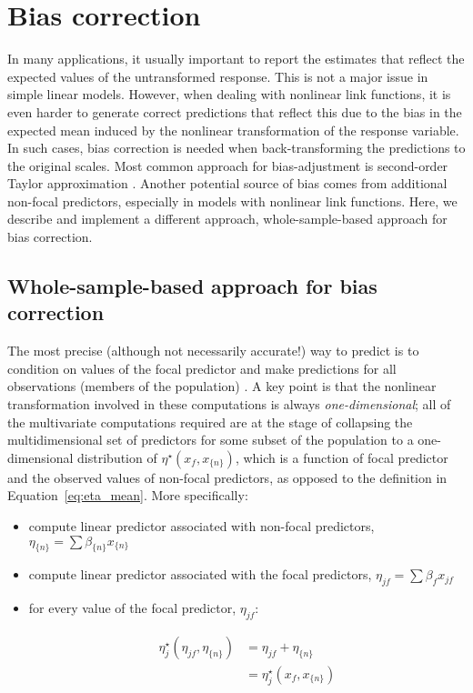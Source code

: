 \documentclass[10pt,letterpaper]{article}
\newcommand{\nset}[1]{#1_{\{n\}}}
\begin{document}
\section*{Bias correction}

In many applications, it usually important to report the estimates that reflect the expected values of the untransformed response. This is not a major issue in simple linear models. However, when dealing with nonlinear link functions, it is even harder to generate correct predictions that reflect this due to the bias in the expected mean induced by the nonlinear transformation of the response variable. In such cases, bias correction is needed when back-transforming the predictions to the original scales. Most common approach for bias-adjustment is second-order Taylor approximation \cite{lenth2018package, duursma2003bias}. Another potential source of bias comes from additional non-focal predictors, especially in models with nonlinear link functions. Here, we describe and implement a different approach, whole-sample-based approach for bias correction.


\subsection*{Whole-sample-based approach for bias correction}

The most precise (although not necessarily accurate!) way to predict is to condition on values of the focal predictor and make predictions for all observations (members of the population) \cite{hanmer2013behind}. A key point is that the nonlinear transformation involved in these computations is always \emph{one-dimensional}; all of the multivariate computations required are at the stage of collapsing the multidimensional set of predictors for some subset of the population to a one-dimensional distribution of $\eta^\star(x_f, \nset{x})$, which is a function of focal predictor and the observed values of non-focal predictors, as opposed to the definition in Equation~\ref{eq:eta_mean}. More specifically:

\begin{itemize}
\item compute linear predictor associated with non-focal predictors, $\nset{\eta} = \sum \nset{\beta} \nset{x}$
\item compute linear predictor associated with the focal predictors, $\eta_{jf} = \sum{\beta_f x_{jf}}$
\item for every value of the focal predictor, $\eta_{jf}$:

\begin{align}\label{eq:pop_eta} 
\eta_j^\star(\eta_{jf}, \nset{\eta})  &= \eta_{jf} + \nset{\eta} \nonumber \\
&= \eta_j^\star(x_f, \nset{x})
\end{align}
\end{itemize}
\end{document}

